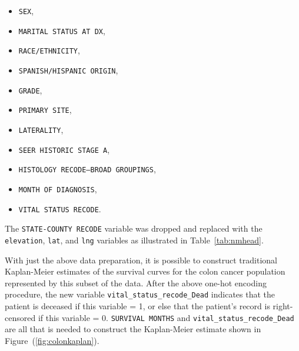 \documentclass[a4paper,11pt]{article}
\newcommand{\codewhite}[1]{\colorbox{white}{\texttt{#1}}}
\begin{document}
\begin{itemize}[noitemsep]
\item \codewhite{SEX},
\item  \codewhite{MARITAL STATUS AT DX},
\item \codewhite{RACE/ETHNICITY},
\item \codewhite{SPANISH/HISPANIC ORIGIN},
\item \codewhite{GRADE},
\item \codewhite{PRIMARY SITE},
\item \codewhite{LATERALITY},
\item \codewhite{SEER HISTORIC STAGE A},
\item \codewhite{HISTOLOGY RECODE--BROAD GROUPINGS},
\item \codewhite{MONTH OF DIAGNOSIS},
\item  \codewhite{VITAL STATUS RECODE}.
\end{itemize}
The \codewhite{STATE-COUNTY RECODE} variable was dropped and replaced with the \codewhite{elevation}, \codewhite{lat}, and \codewhite{lng} variables as illustrated in Table~\ref{tab:nmhead}.

With just the above data preparation, it is possible to construct traditional Kaplan-Meier estimates of the survival curves for the colon cancer population represented by this subset of the data.
After the above one-hot encoding procedure, the new variable
\codewhite{vital\_status\_recode\_Dead} indicates that the patient is deceased if this variable = 1, or else that the patient's record is right-censored if this variable = 0.
\codewhite{SURVIVAL MONTHS} and \codewhite{vital\_status\_recode\_Dead} are all that is needed to construct the Kaplan-Meier estimate shown in Figure~(\ref{fig:colonkaplan}).
\end{document}

